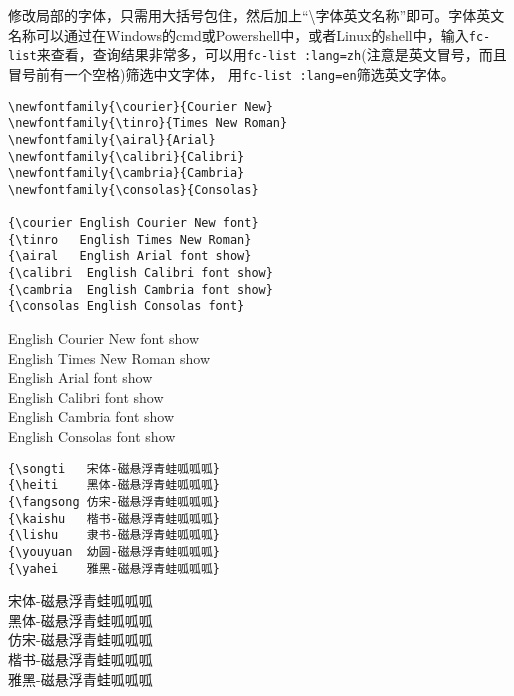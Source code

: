 \documentclass[fontset=windows]{article}
\begin{document}
\begin{multicols}{2}
\begin{enumerate}
修改局部的字体，只需用大括号包住，然后加上“\textbackslash 字体英文名称”即可。字体英文名称可以通过在Windows的cmd或Powershell中，或者Linux的shell中，输入\verb|fc-list|来查看，查询结果非常多，可以用\verb|fc-list :lang=zh|(注意是英文冒号，而且冒号前有一个空格)筛选中文字体，
用\verb|fc-list :lang=en|筛选英文字体。
\begin{lstlisting}
\newfontfamily{\courier}{Courier New}
\newfontfamily{\tinro}{Times New Roman}
\newfontfamily{\airal}{Arial}
\newfontfamily{\calibri}{Calibri}
\newfontfamily{\cambria}{Cambria}
\newfontfamily{\consolas}{Consolas}

{\courier English Courier New font}
{\tinro   English Times New Roman}
{\airal   English Arial font show}
{\calibri  English Calibri font show}
{\cambria  English Cambria font show}
{\consolas English Consolas font}
\end{lstlisting} 
{\courier English Courier New font show} \\  
{\tinro   English Times New Roman show} \\  
{\airal   English Arial font show} \\  
{\calibri  English Calibri font show} \\  
{\cambria  English Cambria font show} \\  
{\consolas English Consolas font show}   
\begin{lstlisting}
{\songti   宋体-磁悬浮青蛙呱呱呱}
{\heiti    黑体-磁悬浮青蛙呱呱呱}
{\fangsong 仿宋-磁悬浮青蛙呱呱呱}
{\kaishu   楷书-磁悬浮青蛙呱呱呱}
{\lishu    隶书-磁悬浮青蛙呱呱呱}
{\youyuan  幼圆-磁悬浮青蛙呱呱呱}
{\yahei    雅黑-磁悬浮青蛙呱呱呱}
\end{lstlisting} 
{\songti   宋体-磁悬浮青蛙呱呱呱} \\ 
{\heiti    黑体-磁悬浮青蛙呱呱呱} \\  
{\fangsong 仿宋-磁悬浮青蛙呱呱呱} \\   
{\kaishu   楷书-磁悬浮青蛙呱呱呱} \\  
{\yahei    雅黑-磁悬浮青蛙呱呱呱}  


\end{enumerate}
\end{multicols}
\end{document}
